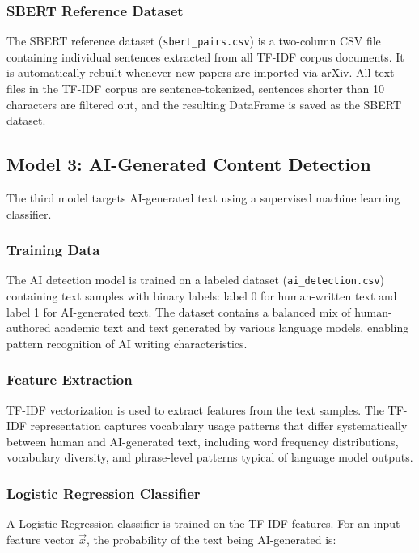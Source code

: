 \documentclass[conference]{IEEEtran}
\begin{document}
\subsubsection{SBERT Reference Dataset}

The SBERT reference dataset (\texttt{sbert\_pairs.csv}) is a two-column CSV file containing individual sentences extracted from all TF-IDF corpus documents. It is automatically rebuilt whenever new papers are imported via arXiv. All text files in the TF-IDF corpus are sentence-tokenized, sentences shorter than 10 characters are filtered out, and the resulting DataFrame is saved as the SBERT dataset.

\subsection{Model 3: AI-Generated Content Detection}

The third model targets AI-generated text using a supervised machine learning classifier.

\subsubsection{Training Data}

The AI detection model is trained on a labeled dataset (\texttt{ai\_detection.csv}) containing text samples with binary labels: label 0 for human-written text and label 1 for AI-generated text. The dataset contains a balanced mix of human-authored academic text and text generated by various language models, enabling pattern recognition of AI writing characteristics.

\subsubsection{Feature Extraction}

TF-IDF vectorization is used to extract features from the text samples. The TF-IDF representation captures vocabulary usage patterns that differ systematically between human and AI-generated text, including word frequency distributions, vocabulary diversity, and phrase-level patterns typical of language model outputs.

\subsubsection{Logistic Regression Classifier}

A Logistic Regression classifier is trained on the TF-IDF features. For an input feature vector $\vec{x}$, the probability of the text being AI-generated is:
\end{document}
